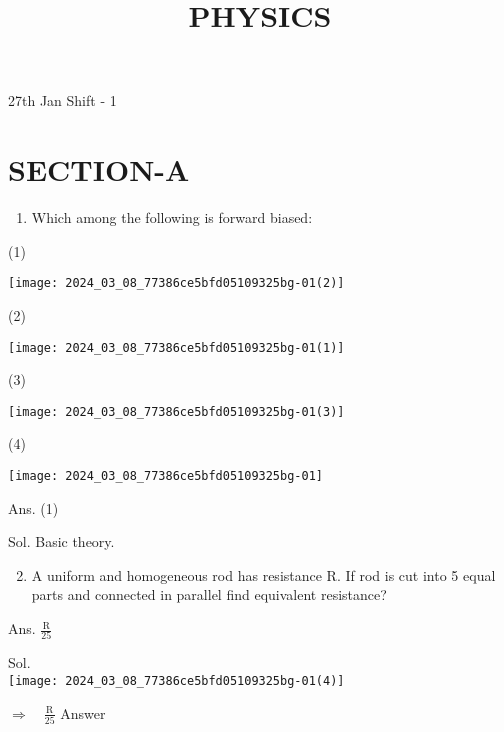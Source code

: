 \documentclass[10pt]{article}
\title{PHYSICS }
\author{}
\date{}
\begin{document}
\maketitle
27th Jan Shift - 1

\section*{SECTION-A}
\begin{enumerate}
  \item Which among the following is forward biased:
\end{enumerate}

(1)

\begin{center}
\texttt{[image: 2024\_03\_08\_77386ce5bfd05109325bg-01(2)]}
\end{center}

(2)

\begin{center}
\texttt{[image: 2024\_03\_08\_77386ce5bfd05109325bg-01(1)]}
\end{center}

(3)

\begin{center}
\texttt{[image: 2024\_03\_08\_77386ce5bfd05109325bg-01(3)]}
\end{center}

(4)

\begin{center}
\texttt{[image: 2024\_03\_08\_77386ce5bfd05109325bg-01]}
\end{center}

Ans. (1)

Sol. Basic theory.

\begin{enumerate}
  \setcounter{enumi}{1}
  \item A uniform and homogeneous rod has resistance R. If rod is cut into 5 equal parts and connected in parallel find equivalent resistance?
\end{enumerate}

Ans. $\frac{\mathrm{R}}{25}$

Sol.\\
\texttt{[image: 2024\_03\_08\_77386ce5bfd05109325bg-01(4)]}

$\Rightarrow \quad \frac{\mathrm{R}}{25}$ Answer
\end{document}
